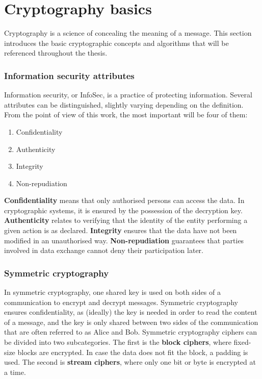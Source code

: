 \section{Cryptography basics}
Cryptography is a science of concealing the meaning of a message. This section introduces the basic cryptographic concepts and algorithms that will be referenced throughout the thesis.

\subsubsection{Information security attributes}
Information security, or InfoSec, is a practice of protecting information. Several attributes can be distinguished, slightly varying depending on the definition. From the point of view of this work, the most important will be four of them:
\begin{enumerate}
    \item Confidentiality
    \item Authenticity
    \item Integrity
    \item Non-repudiation
\end{enumerate}
\textbf{Confidentiality} means that only authorised persons can access the data. In cryptographic systems, it is ensured by the possession of the decryption key. \textbf{Authenticity} relates to verifying that the identity of the entity performing a given action is as declared. \textbf{Integrity} ensures that the data have not been modified in an unauthorised way. \textbf{Non-repudiation} guarantees that parties involved in data exchange cannot deny their participation later.

\subsubsection{Symmetric cryptography}
In symmetric cryptography, one shared key is used on both sides of a communication to encrypt and decrypt messages. Symmetric cryptography ensures confidentiality, as (ideally) the key is needed in order to read the content of a message, and the key is only shared between two sides of the communication that are often referred to as Alice and Bob. Symmetric cryptography ciphers can be divided into two subcategories. The first is the \textbf{block ciphers}, where fixed-size blocks are encrypted. In case the data does not fit the block, a padding is used. The second is \textbf{stream ciphers}, where only one bit or byte is encrypted at a time.

